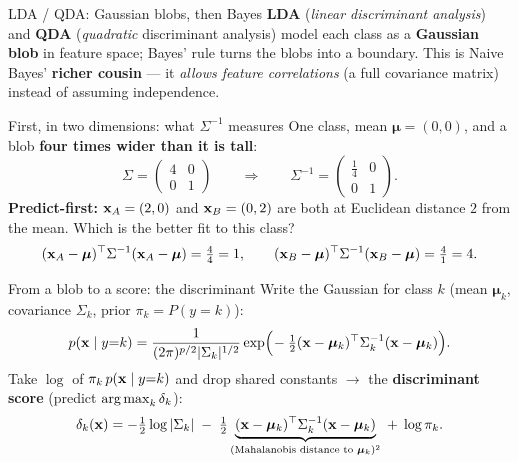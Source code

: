 \documentclass[aspectratio=169]{beamer}
\begin{document}
\begin{frame}{LDA / QDA: Gaussian blobs, then Bayes}
  \textbf{LDA} (\emph{linear discriminant analysis}) and \textbf{QDA} (\emph{quadratic} discriminant
  analysis) model each class as a \textbf{Gaussian blob} in feature space; Bayes' rule turns the
  blobs into a boundary. This is Naive Bayes' \textbf{richer cousin} --- it \emph{allows feature
  correlations} (a full covariance matrix) instead of assuming independence.
  \vfill
\end{frame}

\begin{frame}{First, in two dimensions: what $\Sigma^{-1}$ measures}
  One class, mean $\bm{\mu}=(0,0)$, and a blob \textbf{four times wider than it is tall}:
  \[
    \Sigma = \begin{pmatrix} 4 & 0\\ 0 & 1\end{pmatrix}
    \qquad\Rightarrow\qquad
    \Sigma^{-1} = \begin{pmatrix} \tfrac14 & 0\\ 0 & 1\end{pmatrix}.
  \]
  \textbf{Predict-first:} $\mathbf{x}_A=(2,0)$ and $\mathbf{x}_B=(0,2)$ are both at Euclidean distance $2$ from
  the mean. Which is the better fit to this class?
  \pause
  \[
    (\mathbf{x}_A-\bm{\mu})^\top\Sigma^{-1}(\mathbf{x}_A-\bm{\mu}) = \tfrac44 = 1,
    \qquad
    (\mathbf{x}_B-\bm{\mu})^\top\Sigma^{-1}(\mathbf{x}_B-\bm{\mu}) = \tfrac41 = 4.
  \]
\end{frame}

\begin{frame}{From a blob to a score: the discriminant}
  Write the Gaussian for class $k$ (mean $\bm{\mu}_k$, covariance $\Sigma_k$, prior $\pi_k=P(y{=}k)$):
  \[
    p(\mathbf{x}\mid y{=}k) = \frac{1}{(2\pi)^{p/2}|\Sigma_k|^{1/2}}
      \exp\!\Big(\!-\tfrac12(\mathbf{x}-\bm{\mu}_k)^\top\Sigma_k^{-1}(\mathbf{x}-\bm{\mu}_k)\Big).
  \]
  Take $\log$ of $\pi_k\,p(\mathbf{x}\mid y{=}k)$ and drop shared constants $\to$ the \textbf{discriminant score}
  (predict $\mathop{\mathrm{arg\,max}}_k \delta_k$):
  \[
    \delta_k(\mathbf{x}) = -\tfrac12\log|\Sigma_k|
      \;-\;\tfrac12\underbrace{(\mathbf{x}-\bm{\mu}_k)^\top\Sigma_k^{-1}(\mathbf{x}-\bm{\mu}_k)}_{\text{(Mahalanobis distance to }\bm{\mu}_k)^2}
      \;+\;\log\pi_k.
  \]
\end{frame}
\end{document}

